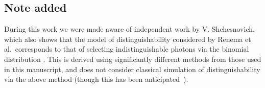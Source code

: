 \subsection{Note added}

During this work we were made aware of independent work by V. Shchesnovich, which also shows that the model of distinguishability considered by Renema et al.\ corresponds to that of selecting indistinguishable photons via the binomial distribution \cite{shchesnovich2019}. 
This is derived using significantly different methods from those used in this manuscript, and does not consider classical simulation of distinguishability via the above method (though this has been anticipated~\cite{shchesnovich2019clifford}).